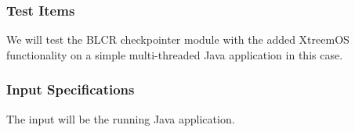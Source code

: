




\subsubsection{Test Items}
We will test the BLCR checkpointer module with the added XtreemOS functionality on a simple multi-threaded Java application in this case.

\subsubsection{Input Specifications}
The input will be the running Java application.


